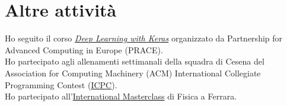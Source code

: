 \documentclass[curriculum-vitae-ita]{subfiles}
\begin{document}
	\section*{Altre attività}
		 Ho seguito il corso \href{https://prace-indico.niif.hu/event/1336/overview}{\textit{Deep Learning with Keras}} organizzato da Partnership for Advanced Computing in Europe (PRACE).\\
	
		 Ho partecipato agli allenamenti settimanali della squadra di Cesena del Association for Computing Machinery (ACM) International Collegiate Programming Contest (\href{https://icpc.global}{ICPC}).\\
		
		 Ho partecipato all'\href{https://physicsmasterclasses.org}{International Masterclass} di Fisica a Ferrara.
	
\end{document}
